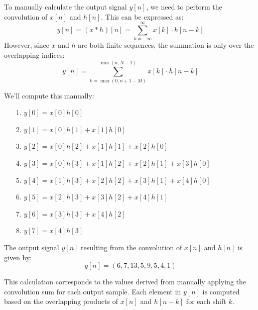 
\item[(b)]
To manually calculate the output signal $y[n]$, we need to perform the convolution of $x[n]$ and $h[n]$.
This can be expressed as:
$$
y[n] = (x * h)[n] = \sum_{k=-\infty}^\infty x[k] \cdot h[n-k]
$$
However, since $x$ and $h$ are both finite sequences, the summation is only over the overlapping indices:
$$
y[n] = \sum_{k=\max(0, n+1-M)}^{\min(n, N-1)} x[k] \cdot h[n-k]
$$

We'll compute this manually:

\begin{enumerate}
\item[1.] $y[0] = x[0]h[0]$
\item[2.] $y[1] = x[0]h[1] + x[1]h[0]$
\item[3.] $y[2] = x[0]h[2] + x[1]h[1] + x[2]h[0]$
\item[4.] $y[3] = x[0]h[3] + x[1]h[2] + x[2]h[1] + x[3]h[0]$
\item[5.] $y[4] = x[1]h[3] + x[2]h[2] + x[3]h[1] + x[4]h[0]$
\item[6.] $y[5] = x[2]h[3] + x[3]h[2] + x[4]h[1]$
\item[7.] $y[6] = x[3]h[3] + x[4]h[2]$
\item[8.] $y[7] = x[4]h[3]$
\end{enumerate}

The output signal $y[n]$ resulting from the convolution of $x[n]$ and $h[n]$ is given by:
$$
y[n] = (6, 7, 13, 5, 9, 5, 4, 1)
$$

This calculation corresponds to the values derived from manually applying the convolution sum for each output sample.
Each element in $y[n]$ is computed based on the overlapping products of $x[n]$ and $h[n-k]$ for each shift $k$.